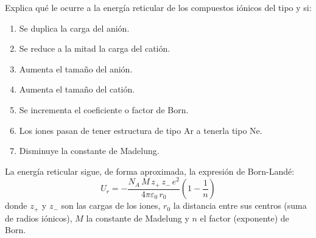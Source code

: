 \begin{exercise}
    Explica qué le ocurre a la energía reticular de los compuestos iónicos del tipo  y  si:
    \begin{enumerate}[label=\letraminuscula]
        \item Se duplica la carga del anión.
        \item Se reduce a la mitad la carga del catión.
        \item Aumenta el tamaño del anión.
        \item Aumenta el tamaño del catión.
        \item Se incrementa el coeficiente o factor de Born.
        \item Los iones pasan de tener estructura de tipo Ar a tenerla tipo Ne.
        \item Disminuye la constante de Madelung.
    \end{enumerate}
    \begin{solu}

        La energía reticular sigue, de forma aproximada, la expresión de Born-Landé:
        \[
            U_r = -\frac{N_A \, M \, z_+ \, z_- \, e^2}{4\pi\varepsilon_0 \, r_0}\left(1-\frac{1}{n}\right)
        \]
        donde \(z_+\) y \(z_-\) son las cargas de los iones, \(r_0\) la distancia entre sus centros (suma de radios iónicos), \(M\) la constante de Madelung y \(n\) el factor (exponente) de Born.


\end{solu}
\end{exercise}
